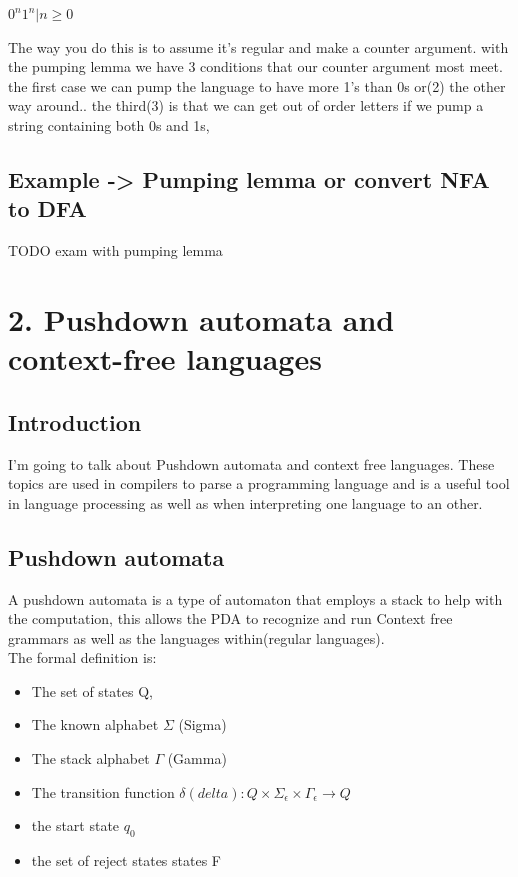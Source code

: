 \documentclass[a4paper,10pt,titlepage]{report}
\begin{document}
$0^n1^n | n \geq 0$

The way you do this is to assume it's regular and make a counter argument. with the pumping lemma we have 3 conditions that our counter argument most meet. the first case we can pump the language to have more 1's than 0s or(2) the other way around.. the third(3) is that we can get out of order letters if we pump a string containing both 0s and 1s, 
	


\subsection{Example -> Pumping lemma or convert NFA to DFA}

TODO exam with pumping lemma

\newpage
\section{2. Pushdown automata and context-free languages}


\subsection{Introduction}
I'm going to talk about Pushdown automata and context free languages. These topics are used in compilers to parse a programming language and is a useful tool in language processing as well as when interpreting one language to an other.
\subsection{Pushdown automata}
A pushdown automata is a type of automaton that employs a stack to help with the computation, this allows the PDA to recognize and run Context free grammars as well as the languages within(regular languages).\\

The formal definition is:

\begin{itemize}
\item The set of states Q, 
\item The known alphabet $\Sigma$ (Sigma) 
\item The stack alphabet $\Gamma $ (Gamma)
\item The transition function $\delta (delta): Q \times \Sigma_\epsilon \times \Gamma_\epsilon\longrightarrow Q$
\item the start state $q_0$ 
\item the set of reject states states F
\end{itemize} 
\end{document}
